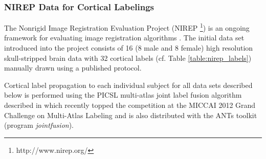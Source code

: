 \subsubsection{NIREP Data for Cortical Labelings}

The Nonrigid Image Registration Evaluation Project (NIREP%
\footnote{
http://www.nirep.org/
}) 
is an ongoing framework for evaluating image registration algorithms \citep{christensen2006}.
The initial data set introduced into the project consists of 
16 (8 male and 8 female) high resolution skull-stripped brain 
data with 32 cortical labels (cf. Table \ref{table:nirep_labels}) manually drawn using a 
published protocol.

Cortical label propagation to each individual subject for all data sets
described below is performed using the PICSL multi-atlas joint label fusion
algorithm described in \cite{wang2013} which recently topped the competition
at the MICCAI 2012 Grand Challenge on Multi-Atlas Labeling and is also 
distributed with the ANTs toolkit (program {\em jointfusion}).



